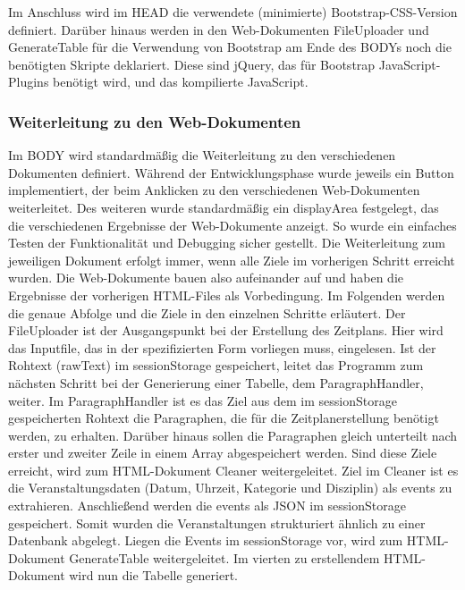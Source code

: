 {Im Anschluss wird im HEAD die verwendete (minimierte) Bootstrap-CSS-Version definiert. 
Darüber hinaus werden in den Web-Dokumenten FileUploader und GenerateTable für die Verwendung von Bootstrap am Ende des BODYs noch die benötigten Skripte deklariert. Diese sind jQuery, das für Bootstrap JavaScript-Plugins benötigt wird, und das kompilierte JavaScript. 

\subsubsection{Weiterleitung zu den Web-Dokumenten}
Im BODY wird standardmäßig die Weiterleitung zu den verschiedenen Dokumenten definiert. 
Während der Entwicklungsphase wurde jeweils ein Button implementiert, der beim Anklicken zu den verschiedenen Web-Dokumenten weiterleitet. Des weiteren wurde standardmäßig ein displayArea festgelegt, das die verschiedenen Ergebnisse der Web-Dokumente anzeigt. So wurde ein einfaches Testen der Funktionalität und Debugging sicher gestellt. 
Die Weiterleitung zum jeweiligen Dokument erfolgt immer, wenn alle Ziele im vorherigen Schritt erreicht wurden. Die Web-Dokumente bauen also aufeinander auf und haben die Ergebnisse der vorherigen HTML-Files als Vorbedingung. Im Folgenden werden die genaue Abfolge und die Ziele in den einzelnen Schritte erläutert.
Der FileUploader ist der Ausgangspunkt bei der Erstellung des Zeitplans. Hier wird das Inputfile, das in der spezifizierten Form vorliegen muss, eingelesen. Ist der Rohtext (rawText) im sessionStorage gespeichert, leitet das Programm zum nächsten Schritt bei der Generierung einer Tabelle, dem ParagraphHandler, weiter.
Im ParagraphHandler ist es das Ziel aus dem im sessionStorage gespeicherten Rohtext die Paragraphen, die für die Zeitplanerstellung benötigt werden, zu erhalten. Darüber hinaus sollen die Paragraphen gleich unterteilt nach erster und zweiter Zeile in einem Array abgespeichert werden. Sind diese Ziele erreicht, wird zum HTML-Dokument Cleaner weitergeleitet.
Ziel im Cleaner ist es die Veranstaltungsdaten (Datum, Uhrzeit, Kategorie und Disziplin) als events zu extrahieren. 
Anschließend werden die events als JSON im sessionStorage gespeichert. Somit wurden die Veranstaltungen strukturiert ähnlich zu einer Datenbank abgelegt. Liegen die Events im sessionStorage vor, wird zum HTML-Dokument GenerateTable weitergeleitet.
Im vierten zu erstellendem HTML-Dokument wird nun die Tabelle generiert. \\
}
